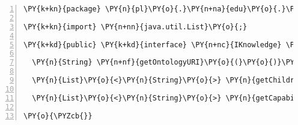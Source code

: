 \begin{Verbatim}[commandchars=\\\{\},numbers=left,firstnumber=1,stepnumber=1]
\PY{k+kn}{package} \PY{n}{pl}\PY{o}{.}\PY{n+na}{edu}\PY{o}{.}\PY{n+na}{agh}\PY{o}{.}\PY{n+na}{semsimmon}\PY{o}{.}\PY{n+na}{common}\PY{o}{.}\PY{n+na}{api}\PY{o}{.}\PY{n+na}{knowledge}\PY{o}{;}

\PY{k+kn}{import} \PY{n+nn}{java.util.List}\PY{o}{;}

\PY{k+kd}{public} \PY{k+kd}{interface} \PY{n+nc}{IKnowledge} \PY{o}{\PYZob{}}

  \PY{n}{String} \PY{n+nf}{getOntologyURI}\PY{o}{(}\PY{o}{)}\PY{o}{;}

  \PY{n}{List}\PY{o}{<}\PY{n}{String}\PY{o}{>} \PY{n}{getChildrenResourceTypes}\PY{o}{(}\PY{n}{String} \PY{n}{type}\PY{o}{)}\PY{o}{;}

  \PY{n}{List}\PY{o}{<}\PY{n}{String}\PY{o}{>} \PY{n}{getCapabilitiesOfResourceType}\PY{o}{(}\PY{n}{String} \PY{n}{type}\PY{o}{)}\PY{o}{;}

\PY{o}{\PYZcb{}}
\end{Verbatim}
